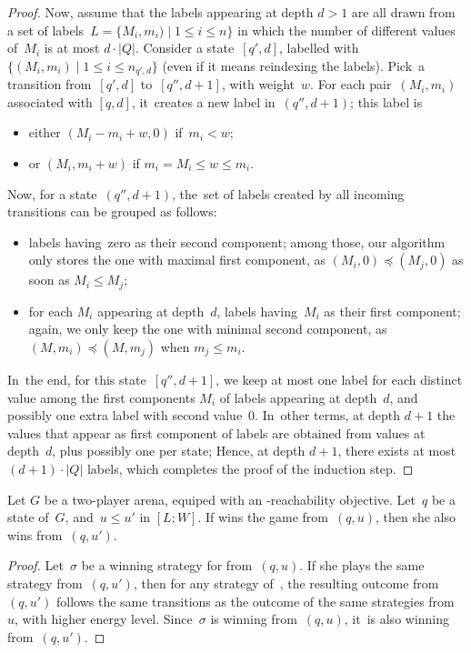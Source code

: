 \begin{proof}
Now, assume that the labels appearing 
at depth $d>1$ are all drawn from a set of labels~$L=\{M_i,m_i) \mid 1\leq i\leq n\}$ in which the
number of different values of~$M_i$ is at most $d\cdot|Q|$.
Consider a state~$[q',d]$, labelled with $\{(M_i,m_i) \mid 1\leq i\leq
n_{q',d}\}$ (even if it means reindexing the labels). Pick~a
transition from~$[q',d]$ to~$[q'',d+1]$, with weight~$w$. For each
pair~$(M_i,m_i)$ associated with $[q,d]$, it~creates a new label in~$(q'',d+1)$; this label
is
\begin{itemize}
\item either $(M_i-m_i+w,0)$ if~$m_i<w$;
\item or $(M_i,m_i+w)$ if $m_i=M_i\leq w\leq m_i$.
\end{itemize}
Now, for a state~$(q'',d+1)$, the~set of labels created by all
incoming transitions can be grouped as follows:
\begin{itemize}
\item labels having~zero as their second component; among those, our
  algorithm only stores the one with maximal first component, as $(M_i,0) \preceq (M_j,0)$ as soon as $M_i\leq M_j$;
\item for each $M_i$ appearing at depth~$d$, labels having~$M_i$ as
  their first component; again, we only keep the one with minimal
  second component, as $(M,m_i) \preceq (M,m_j)$ when $m_j \leq m_i$.
\end{itemize}
In~the end, for this state~$[q'',d+1]$, we keep at most one label for
each distinct value among the first components $M_i$ of labels appearing at depth~$d$, and possibly one extra
label with second value~$0$. In~other terms, at depth $d+1$ the values that appear as first component of labels are 
obtained from values at depth~$d$, plus possibly one per state; Hence, at depth $d+1$, there exists at most $(d+1)\cdot|Q|$ labels, which completes the proof of the induction step.
\end{proof}



  Let $G$ be a two-player arena, equiped with an \LWenergy-reachability
  objective. Let~$q$ be a state of~$G$, and~$u\leq u'$ in $[L;W]$. If
   wins the game from~$(q,u)$, then she also wins from~$(q,u')$.

\begin{proof}
Let~$\sigma$ be a winning strategy for  from~$(q,u)$. If she plays
the same strategy from~$(q,u')$, then for any strategy of~, the
resulting outcome from~$(q,u')$ follows the same transitions as the
outcome of the same strategies from~$u$, with higher energy
level. Since~$\sigma$ is winning from~$(q,u)$, it~is also winning
from~$(q,u')$.
\end{proof}
